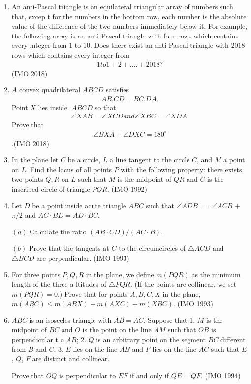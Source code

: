 \begin{enumerate}
\item An anti-Pascal triangle is an equilateral triangular array of numbers such that, excep    t for the numbers in the bottom row, each number is the absolute value of the difference of the two numbers immediately below it. For example, the following array is an anti-Pascal triangle with four rows which contains every integer from $1$ to $10$.
	Does there exist an anti-Pascal triangle with $2018$ rows which contains every integer from \begin{align}1 to 1+2 +....+2018?\end{align} \hfill (IMO 2018)
		\item $A$ convex quadrilateral $ABCD$ satisfies \begin{align}AB.CD=BC.DA.\end{align} Point $X$ lies inside. $ABCD$ so that \begin{align}\angle XAB=\angle XCD and \angle XBC=\angle XDA.    \end{align} Prove that\begin{align}\angle BXA+\angle DXC=180^\circ\end{align}.\hfill (IMO 2018)
\item In the plane let $C$ be a circle, $L$ a line  tangent to the circle $C$, and $M$ a point on $L$. Find the locus of all points $P$ with the following property: there exists two points $Q,R$ on $L$ such that $M$ is the midpoint of $QR$ and $C$ is the inscribed circle of triangle $PQR$.  \hfill(IMO 1992)
\item Let $D$ be a point inside acute triangle $ABC$ such that $\angle ADB$ $=$ $\angle ACB$ $+$ $\pi/2$ and $AC \cdot BD = AD \cdot BC$.
 
  $(a)$ Calculate the ratio $(AB \cdot CD) / (AC \cdot B)$.
 
 $(b)$ Prove that the tangents at $C$ to the circumcircles of $\triangle ACD$ and $\triangle BCD$ are perpendicular. \hfill(IMO 1993)
		
\item For three points $P, Q, R$ in the plane, we define $m(PQR)$ as the minimum length of the three a
ltitudes of $\triangle PQR$. (If the points are collinear, we set $m(PQR) = 0$.)                                                                           
  Prove that for points $A, B, C, X$ in the plane,
                                                     $m(ABC) \leq m(ABX) + m(AXC) + m(XBC)$. \hfill(IMO 1993)
\item $ABC$ is an isosceles triangle with $AB = AC$. Suppose that  
	1. $M$ is the midpoint of $BC$ and $O$ is the point on the line $AM$ such that $OB$ is perpendicular t    o $AB$;                                                                               
2. $Q$ is an arbitrary point on the segment $BC$ different from $B$ and $C$;                           
 3. $E$ lies on the line $AB$ and $F$ lies on the line $AC$ such that $E$, $Q$, $F$ are distinct and collinear.
 
		 Prove that $OQ$ is perpendicular to $EF$ if and only if $QE=QF$.    \hfill(IMO 1994)
\end{enumerate}
